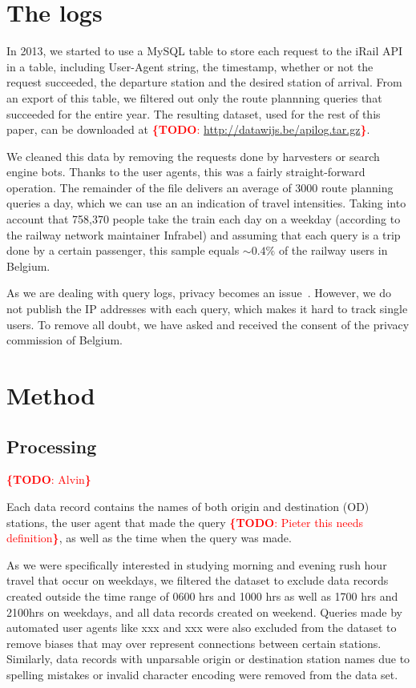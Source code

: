 \documentclass{sig-alternate}
\newcommand{\todo}[1]{\noindent\textcolor{red}{{\bf \{TODO}: #1{\bf \}}}}
\begin{document}
\section{The logs}
\label{sec:logs}

In 2013, we started to use a MySQL table to store each request to the iRail API in a table, including User-Agent string, the timestamp, whether or not the request succeeded, the departure station and the desired station of arrival.
From an export of this table, we filtered out only the route plannning queries that succeeded for the entire year.
The resulting dataset, used for the rest of this paper, can be downloaded at \todo{\url{http://datawijs.be/apilog.tar.gz}}.

We cleaned this data by removing the requests done by harvesters or search engine bots.
Thanks to the user agents, this was a fairly straight-forward operation.
The remainder of the file delivers an average of 3000 route planning queries a day, which we can use an an indication of travel intensities.
Taking into account that 758,370 people take the train each day on a weekday (according to the railway network maintainer Infrabel) and assuming that each query is a trip done by a certain passenger, this sample equals $\sim0.4\%$ of the railway users in Belgium.

As we are dealing with query logs, privacy becomes an issue~\cite{silvestri}.
However, we do not publish the IP addresses with each query, which makes it hard to track single users.
To remove all doubt, we have asked and received the consent of the privacy commission of Belgium.

\section{Method}
\label{sec:method}

\subsection{Processing}
\todo{Alvin}

Each data record contains the names of both origin and destination (OD) stations, the user agent that made the query \todo{Pieter this needs definition}, as well as the time when the query was made.

As we were specifically interested in studying morning and evening rush hour travel that occur on weekdays, we filtered the dataset to exclude data records created outside the time range of 0600 hrs and 1000 hrs as well as 1700 hrs and 2100hrs on weekdays, and all data records created on weekend. Queries made by automated user agents like xxx and xxx were also excluded from the dataset to remove biases that may over represent connections between certain stations. Similarly, data records with unparsable origin or destination station names due to spelling mistakes or invalid character encoding were removed from the data set.
\end{document}
